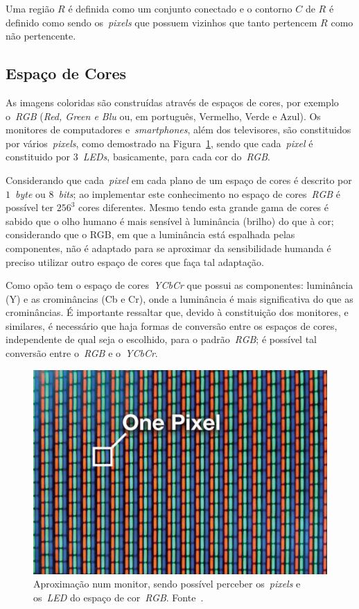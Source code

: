 \documentclass[conference]{Trabalho_Final}
\begin{document}
Uma regi\~ao $R$ \'e definida como um conjunto conectado e o contorno $C$ de $R$ \'e definido como sendo os~\textit{pixels} que possuem vizinhos que tanto pertencem $R$ como n\~ao pertencente.

\subsection{Espa\c{c}o de Cores}
  \label{subsec:cores}
As imagens coloridas s\~ao constru\'idas atrav\'es de espa\c{c}os de cores, por exemplo o~\textit{RGB} (\textit{Red, Green e Blu} ou, em portugu\^es, Vermelho, Verde e Azul). Os monitores de computadores e~\textit{smartphones}, al\'em dos televisores, s\~ao constituidos por v\'arios~\textit{pixels}, como demostrado na Figura~\ref{fig:monitorpixel}, sendo que cada~\textit{pixel} \'e constituido por $3$~\textit{LEDs}, basicamente, para cada cor do~\textit{RGB}.

Considerando que cada~\textit{pixel} em cada plano de um espa\c{c}o de cores \'e descrito por $1$~\textit{byte} ou $8$~\textit{bits}; ao implementar este conhecimento no espa\c{c}o de cores~\textit{RGB} \'e poss\'ivel ter $256^3$ cores diferentes. Mesmo tendo esta grande gama de cores \'e sabido que o olho humano \'e mais sens\'ivel \`a lumin\^ancia (brilho) do que \`a cor; considerando que o RGB, em que a lumin\^ancia est\'a espalhada pelas componentes, n\~ao \'e adaptado para se aproximar da sensibilidade humanda \'e preciso utilizar outro espa\c{c}o de cores que fa\c{c}a tal adapta\c{c}\~ao.

Como op\~ao tem o espa\c{c}o de cores~\textit{YCbCr} que possui as componentes: lumin\^ancia (Y) e as cromin\^ancias (Cb e Cr), onde a lumin\^ancia \'e mais significativa do que as cromin\^ancias. \'E importante ressaltar que, devido \`a constitui\c{c}\~ao dos monitores, e similares, \'e necess\'ario que haja formas de convers\~ao entre os espa\c{c}os de cores, independente de qual seja o escolhido, para o padr\~ao~\textit{RGB}; \'e poss\'ivel tal convers\~ao entre o~\textit{RGB} e o~\textit{YCbCr}.

\begin{figure}[]
  \centering
  \includegraphics[width = 3.5 cm]{monitorpixel}
  \caption{Aproxima\c{c}\~ao num monitor, sendo poss\'ivel perceber os~\textit{pixels} e os~\textit{LED} do espa\c{c}o de cor~\textit{RGB}. Fonte~\cite{monitor}.}
  \label{fig:monitorpixel}
\end{figure}
\end{document}
